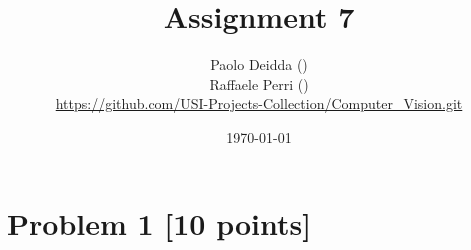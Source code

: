 \documentclass[12pt]{article}
\author{
	Paolo Deidda (\text{paolo.deidda@usi.ch}) \\ 
    Raffaele Perri (\text{raffaele.perri@usi.ch}) \\
    \url{https://github.com/USI-Projects-Collection/Computer_Vision.git}
}
\date{\today}
\begin{document}
\title{Assignment 7}
\maketitle

\section*{Problem 1 [10 points]}


% 

% 
\end{document}
